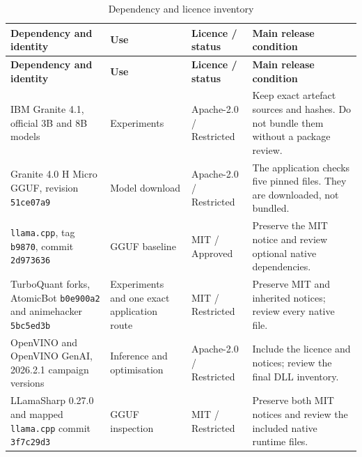 \begingroup
\small
\setlength{\LTpre}{4pt}
\setlength{\LTpost}{4pt}
\renewcommand{\arraystretch}{0.96}
\begin{longtable}{@{}P{0.29\dimexpr{}\tabcolsep\relax}P{0.18\dimexpr{}\tabcolsep\relax}P{0.18\dimexpr{}\tabcolsep\relax}P{0.35\dimexpr{}\tabcolsep\relax}@{}}
    \caption{Dependency and licence inventory}
    \label{tab:licence-inventory} \\
    \toprule
    \textbf{Dependency and identity} & \textbf{Use} &
    \textbf{Licence / status} & \textbf{Main release condition} \\
    \midrule
    \endfirsthead

    \toprule
    \textbf{Dependency and identity} & \textbf{Use} &
    \textbf{Licence / status} & \textbf{Main release condition} \\
    \midrule
    \endhead

    IBM Granite 4.1, official 3B and 8B models &
    Experiments & Apache-2.0 / Restricted & Keep exact artefact sources
    and hashes. Do not bundle them without a package review. \\

    Granite 4.0 H Micro GGUF, revision \texttt{51ce07a9} &
    Model download & Apache-2.0 / Restricted &
    The application checks five pinned files. They are downloaded, not bundled. \\

    \texttt{llama.cpp}, tag \texttt{b9870}, commit \texttt{2d973636} &
    GGUF baseline & MIT / Approved &
    Preserve the MIT notice and review optional native dependencies. \\

    TurboQuant forks, AtomicBot \texttt{b0e900a2} and animehacker
    \texttt{5bc5ed3b} & Experiments and one exact application route &
    MIT / Restricted & Preserve MIT and inherited notices; review every native file. \\

    OpenVINO and OpenVINO GenAI, 2026.2.1 campaign versions &
    Inference and optimisation & Apache-2.0 / Restricted &
    Include the licence and notices; review the final DLL inventory. \\

    LLamaSharp 0.27.0 and mapped \texttt{llama.cpp} commit \texttt{3f7c29d3} &
    GGUF inspection & MIT / Restricted &
    Preserve both MIT notices and review the included native runtime files. \\


\end{longtable}
